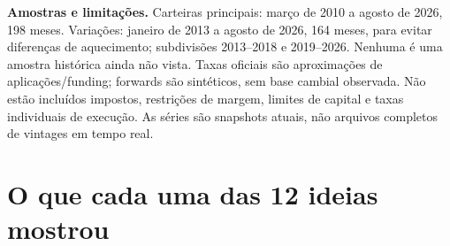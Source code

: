 \documentclass[11pt,a4paper]{article}
\begin{document}
\textbf{Amostras e limitações.} Carteiras principais: março de 2010 a agosto de 2026, 198 meses. Variações: janeiro de 2013 a agosto de 2026, 164 meses, para evitar diferenças de aquecimento; subdivisões 2013--2018 e 2019--2026. Nenhuma é uma amostra histórica ainda não vista. Taxas oficiais são aproximações de aplicações/funding; forwards são sintéticos, sem base cambial observada. Não estão incluídos impostos, restrições de margem, limites de capital e taxas individuais de execução. As séries são snapshots atuais, não arquivos completos de vintages em tempo real.

\clearpage

\section*{O que cada uma das 12 ideias mostrou}
\end{document}
